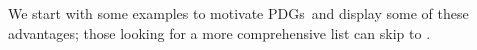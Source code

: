 \documentclass{article}
\newcommand{\MN}{PDG}
\newcommand{\MNs}{\MN s}
\numberwithin{equation}{section}
\begin{document}
\begin{notfocus}
%
	We start with some examples to motivate \MNs\ and display some of these advantages; those looking for a more comprehensive list can skip to .
	

\end{notfocus}
\end{document}
